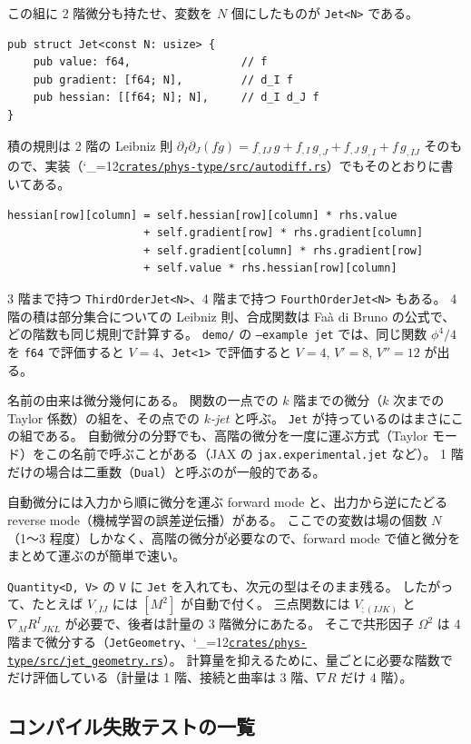 \documentclass[a4paper,11pt]{ltjsarticle}
\newcommand{\code}[1]{\texttt{#1}}
\newcommand{\repourl}{https://github.com/inuverse44/phys-type}
\newcommand{\reporev}{b1fea87}
\newcommand{\repo}{\begingroup\catcode`\_=12\relax\repoaux}
\newcommand{\repoaux}[1]{\href{\repourl/blob/\reporev/#1}{\nolinkurl{#1}}\endgroup}
\begin{document}
この組に 2 階微分も持たせ、変数を $N$ 個にしたものが \code{Jet<N>} である。
\begin{lstlisting}
pub struct Jet<const N: usize> {
    pub value: f64,                 // f
    pub gradient: [f64; N],         // d_I f
    pub hessian: [[f64; N]; N],     // d_I d_J f
}
\end{lstlisting}
積の規則は 2 階の Leibniz 則 $\partial_I\partial_J(fg)=f_{,IJ}\,g+f_{,I}\,g_{,J}+f_{,J}\,g_{,I}+f\,g_{,IJ}$ そのもので、実装（\repo{crates/phys-type/src/autodiff.rs}）でもそのとおりに書いてある。
\begin{lstlisting}
hessian[row][column] = self.hessian[row][column] * rhs.value
                     + self.gradient[row] * rhs.gradient[column]
                     + self.gradient[column] * rhs.gradient[row]
                     + self.value * rhs.hessian[row][column]
\end{lstlisting}
3 階まで持つ \code{ThirdOrderJet<N>}、4 階まで持つ \code{FourthOrderJet<N>} もある。
4 階の積は部分集合についての Leibniz 則、合成関数は Faà di Bruno の公式で、どの階数も同じ規則で計算する。
\code{demo/} の \code{--example jet} では、同じ関数 $\phi^4/4$ を \code{f64} で評価すると $V=4$、\code{Jet<1>} で評価すると $V=4$, $V'=8$, $V''=12$ が出る。

名前の由来は微分幾何にある。
関数の一点での $k$ 階までの微分（$k$ 次までの Taylor 係数）の組を、その点での \emph{$k$-jet} と呼ぶ。
\code{Jet} が持っているのはまさにこの組である。
自動微分の分野でも、高階の微分を一度に運ぶ方式（Taylor モード）をこの名前で呼ぶことがある（JAX の \code{jax.experimental.jet} など）。
1 階だけの場合は二重数（\code{Dual}）と呼ぶのが一般的である。

自動微分には入力から順に微分を運ぶ forward mode と、出力から逆にたどる reverse mode（機械学習の誤差逆伝播）がある。
ここでの変数は場の個数 $N$（1〜3 程度）しかなく、高階の微分が必要なので、forward mode で値と微分をまとめて運ぶのが簡単で速い。

\code{Quantity<D, V>} の \code{V} に \code{Jet} を入れても、次元の型はそのまま残る。
したがって、たとえば $V_{,IJ}$ には $[M^2]$ が自動で付く。
三点関数には $V_{;(IJK)}$ と $\nabla_MR^I{}_{JKL}$ が必要で、後者は計量の 3 階微分にあたる。
そこで共形因子 $\Omega^2$ は 4 階まで微分する（\code{JetGeometry}、\repo{crates/phys-type/src/jet_geometry.rs}）。
計算量を抑えるために、量ごとに必要な階数でだけ評価している（計量は 1 階、接続と曲率は 3 階、$\nabla R$ だけ 4 階）。

\subsection{コンパイル失敗テストの一覧}
\label{sec:compile-fail}
\end{document}

